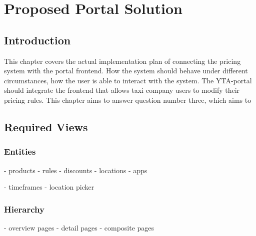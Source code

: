 \graphicspath{{Chapter5/Figs/Vector/}{Chapter5/Figs/}}

%
\chapter{Proposed Portal Solution}

%
\section{Introduction}
This chapter covers the actual implementation plan of connecting the pricing system with the portal frontend. How the system should behave under different circumstances, how the user is able to interact with the system. The YTA-portal should integrate the frontend that allows taxi company users to modify their pricing rules. This chapter aims to answer question number three, which aims to

%
\section{Required Views}

\subsection{Entities}
- products
- rules
- discounts
- locations
- apps

- timeframes
- location picker

\subsection{Hierarchy}
- overview pages
- detail pages
- composite pages

